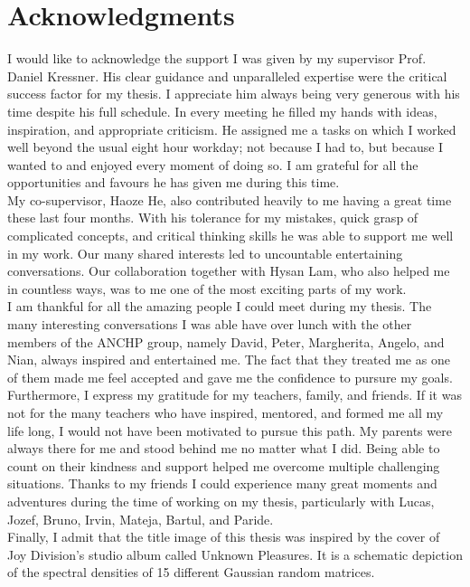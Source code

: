 \chapter*{Acknowledgments}
\label{chp:0-acknowledgments}

I would like to acknowledge the support I was given by my supervisor
Prof. Daniel Kressner. His clear guidance and unparalleled expertise were the
critical success factor for my thesis. I appreciate him always being very generous
with his time despite his full schedule. In every meeting he filled my hands with
ideas, inspiration, and appropriate criticism. He assigned me a tasks on which
I worked well beyond the usual eight hour workday; not because I had to, but because
I wanted to and enjoyed every moment of doing so. I am grateful for all the
opportunities and favours he has given me during this time.\\

My co-supervisor, Haoze He, also contributed heavily to me having a great time
these last four months. With his tolerance for my mistakes, quick grasp of
complicated concepts, and critical thinking skills he was able to support me
well in my work. Our many shared interests led to uncountable
entertaining conversations. Our collaboration together with Hysan Lam, who
also helped me in countless ways, was to me one of the most exciting parts of
my work.\\

I am thankful for all the amazing people I could meet during my thesis.
The many interesting conversations I was able have over lunch with
the other members of the ANCHP group, namely David, Peter,
Margherita, Angelo, and Nian, always inspired and entertained me.
The fact that they treated me as one of them made me feel accepted and gave 
me the confidence to pursure my goals.\\

Furthermore, I express my gratitude for my teachers, family, and friends.
If it was not for the many teachers who have inspired, mentored, and formed me
all my life long, I would not have been motivated to pursue this path.
My parents were always there for me and stood behind me no matter what I did.
Being able to count on their kindness and support helped me overcome multiple
challenging situations. Thanks to my friends I could experience many great moments and adventures
during the time of working on my thesis, particularly with Lucas, Jozef, Bruno,
Irvin, Mateja, Bartul, and Paride.\\ 

Finally, I admit that the title image of this thesis was inspired
by the cover of Joy Division's studio album called Unknown Pleasures.
It is a schematic depiction of the spectral densities of 15 different Gaussian random matrices.
